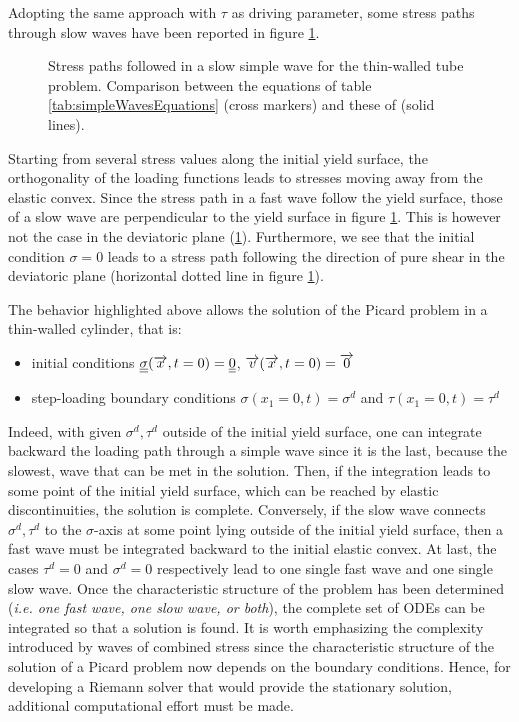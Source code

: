 Adopting the same approach with $\tau$ as driving parameter, some stress paths through slow waves have been reported in figure \ref{fig:tw_slow}.
\begin{figure}[h!]
  \centering
   \qquad
  \caption{Stress paths followed in a slow simple wave for the thin-walled tube problem. Comparison between the equations of table \ref{tab:simpleWavesEquations} (cross markers) and these of \cite{Clifton} (solid lines).}
  \label{fig:tw_slow}
\end{figure}
Starting from several stress values along the initial yield surface, the orthogonality of the loading functions leads to stresses moving away from the elastic convex.
Since the stress path in a fast wave follow the yield surface, those of a slow wave are perpendicular to the yield surface in figure \ref{fig:tw_slow}.
This is however not the case in the deviatoric plane (\ref{fig:tw_slow}).
Furthermore, we see that the initial condition $\sigma=0$ leads to a stress path following the direction of pure shear in the deviatoric plane (horizontal dotted line in figure \ref{fig:tw_slow}).

The behavior highlighted above allows the solution of the Picard problem in a thin-walled cylinder, that is:
\begin{itemize}
\item initial conditions ${\underline{\underline{\sigma}}}({\overrightarrow{x}},t=0)={\underline{\underline{0}}}$, ${\overrightarrow{v}}({\overrightarrow{x}},t=0)={\overrightarrow{0}}$
\item step-loading boundary conditions $\sigma(x_1=0,t)=\sigma^d$ and $\tau(x_1=0,t)=\tau^d$
\end{itemize}
Indeed, with given $\sigma^d,\tau^d$ outside of the initial yield surface, one can integrate backward the loading path through a simple wave since it is the last, because the slowest, wave that can be met in the solution.
Then, if the integration leads to some point of the initial yield surface, which can be reached by elastic discontinuities, the solution is complete.
Conversely, if the slow wave connects $\sigma^d,\tau^d$ to the $\sigma$-axis at some point lying outside of the initial yield surface, then a fast wave must be integrated backward to the initial elastic convex.
At last, the cases $\tau^d=0$ and $\sigma^d=0$ respectively lead to one single fast wave and one single slow wave.
Once the characteristic structure of the problem has been determined (\textit{i.e. one fast wave, one slow wave, or both}), the complete set of ODEs can be integrated so that a solution is found.
It is worth emphasizing the complexity introduced by waves of combined stress since the characteristic structure of the solution of a Picard problem now depends on the boundary conditions.
Hence, for developing a Riemann solver that would provide the stationary solution, additional computational effort must be made.

